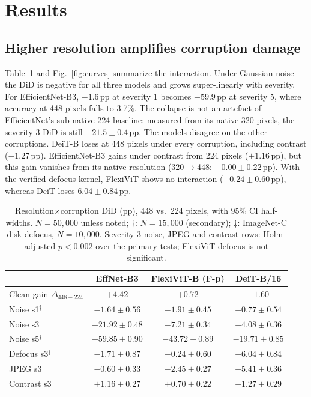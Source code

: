 \documentclass[conference]{IEEEtran}
\newcommand{\pp}{\,\mathrm{pp}}
\begin{document}
\section{Results}
\subsection{Higher resolution amplifies corruption damage}
Table~\ref{tab:did} and Fig.~\ref{fig:curves} summarize the interaction. Under Gaussian noise the DiD is negative for all three models and grows super-linearly with severity. For EfficientNet-B3, $-1.6\pp$ at severity 1 becomes $-59.9\pp$ at severity 5, where accuracy at 448 pixels falls to 3.7\%. The collapse is not an artefact of EfficientNet's sub-native 224 baseline: measured from its native 320 pixels, the severity-3 DiD is still $-21.5\pm0.4\pp$. The models disagree on the other corruptions. DeiT-B loses at 448 pixels under every corruption, including contrast ($-1.27\pp$). EfficientNet-B3 gains under contrast from 224 pixels ($+1.16\pp$), but this gain vanishes from its native resolution (320$\to$448: $-0.00\pm0.22\pp$). With the verified defocus kernel, FlexiViT shows no interaction ($-0.24\pm0.60\pp$), whereas DeiT loses $6.04\pm0.84\pp$.

\begin{table}[t]
\caption{Resolution$\times$corruption DiD (pp), 448 vs.\ 224 pixels, with 95\% CI half-widths. $N=50{,}000$ unless noted; $\dagger$: $N=15{,}000$ (secondary); $\ddagger$: ImageNet-C disk defocus, $N=10{,}000$. Severity-3 noise, JPEG and contrast rows: Holm-adjusted $p<0.002$ over the primary tests; FlexiViT defocus is not significant.}
\label{tab:did}
\centering
\setlength{\tabcolsep}{4pt}
\begin{tabular}{lccc}
\toprule
 & EffNet-B3 & FlexiViT-B (F-p) & DeiT-B/16\\
\midrule
Clean gain $\Delta_{448-224}$ & $+4.42$ & $+0.72$ & $-1.60$\\
Noise s1$^\dagger$ & $-1.64\pm0.56$ & $-1.91\pm0.45$ & $-0.77\pm0.54$\\
Noise s3 & $-21.92\pm0.48$ & $-7.21\pm0.34$ & $-4.08\pm0.36$\\
Noise s5$^\dagger$ & $-59.85\pm0.90$ & $-43.72\pm0.89$ & $-19.71\pm0.85$\\
Defocus s3$^\ddagger$ & $-1.71\pm0.87$ & $-0.24\pm0.60$ & $-6.04\pm0.84$\\
JPEG s3 & $-0.60\pm0.33$ & $-2.45\pm0.27$ & $-5.41\pm0.36$\\
Contrast s3 & $+1.16\pm0.27$ & $+0.70\pm0.22$ & $-1.27\pm0.29$\\
\bottomrule
\end{tabular}
\end{table}
\end{document}
